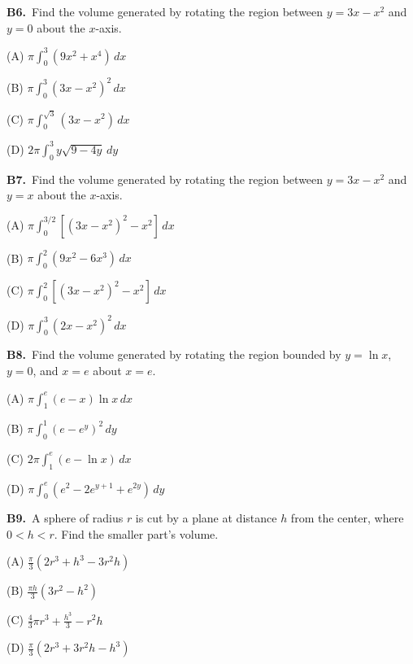 \documentclass[11pt]{article}
\begin{document}
\bigskip\noindent\textbf{B6.}\ Find the volume generated by rotating the region between $y=3x-x^2$ and $y=0$ about the $x$-axis.
\begin{list}{}{\setlength{\leftmargin}{3em}\setlength{\labelwidth}{2.5em}\setlength{\itemsep}{0pt}\setlength{\topsep}{2pt}}
\item[(A)] $\pi\int_0^3(9x^2+x^4)\,dx$
\item[(B)] $\pi\int_0^3(3x-x^2)^2\,dx$
\item[(C)] $\pi\int_0^{\sqrt3}(3x-x^2)\,dx$
\item[(D)] $2\pi\int_0^3y\sqrt{9-4y}\,dy$
\end{list}

\bigskip\noindent\textbf{B7.}\ Find the volume generated by rotating the region between $y=3x-x^2$ and $y=x$ about the $x$-axis.
\begin{list}{}{\setlength{\leftmargin}{3em}\setlength{\labelwidth}{2.5em}\setlength{\itemsep}{0pt}\setlength{\topsep}{2pt}}
\item[(A)] $\pi\int_0^{3/2}[(3x-x^2)^2-x^2]\,dx$
\item[(B)] $\pi\int_0^2(9x^2-6x^3)\,dx$
\item[(C)] $\pi\int_0^2[(3x-x^2)^2-x^2]\,dx$
\item[(D)] $\pi\int_0^3(2x-x^2)^2\,dx$
\end{list}

\bigskip\noindent\textbf{B8.}\ Find the volume generated by rotating the region bounded by $y=\ln x$, $y=0$, and $x=e$ about $x=e$.
\begin{list}{}{\setlength{\leftmargin}{3em}\setlength{\labelwidth}{2.5em}\setlength{\itemsep}{0pt}\setlength{\topsep}{2pt}}
\item[(A)] $\pi\int_1^e(e-x)\ln x\,dx$
\item[(B)] $\pi\int_0^1(e-e^y)^2\,dy$
\item[(C)] $2\pi\int_1^e(e-\ln x)\,dx$
\item[(D)] $\pi\int_0^e(e^2-2e^{y+1}+e^{2y})\,dy$
\end{list}

\bigskip\noindent\textbf{B9.}\ A sphere of radius $r$ is cut by a plane at distance $h$ from the center, where $0<h<r$. Find the smaller part's volume.
\begin{list}{}{\setlength{\leftmargin}{3em}\setlength{\labelwidth}{2.5em}\setlength{\itemsep}{0pt}\setlength{\topsep}{2pt}}
\item[(A)] $\tfrac\pi3(2r^3+h^3-3r^2h)$
\item[(B)] $\tfrac{\pi h}3(3r^2-h^2)$
\item[(C)] $\tfrac43\pi r^3+\tfrac{h^3}3-r^2h$
\item[(D)] $\tfrac\pi3(2r^3+3r^2h-h^3)$
\end{list}
\end{document}
